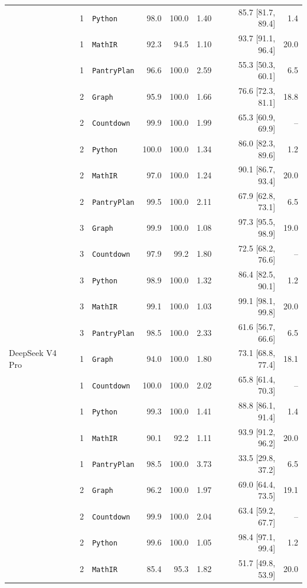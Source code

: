 \begin{longtable}{@{}lrlrrrrr@{}}
     & 1 & \texttt{Python} & 98.0 & 100.0 & 1.40 & 85.7 [81.7, 89.4] & 1.4 \\
     & 1 & \texttt{MathIR} & 92.3 & 94.5 & 1.10 & 93.7 [91.1, 96.4] & 20.0 \\
     & 1 & \texttt{PantryPlan} & 96.6 & 100.0 & 2.59 & 55.3 [50.3, 60.1] & 6.5 \\
     & 2 & \texttt{Graph} & 95.9 & 100.0 & 1.66 & 76.6 [72.3, 81.1] & 18.8 \\
     & 2 & \texttt{Countdown} & 99.9 & 100.0 & 1.99 & 65.3 [60.9, 69.9] & -- \\
     & 2 & \texttt{Python} & 100.0 & 100.0 & 1.34 & 86.0 [82.3, 89.6] & 1.2 \\
     & 2 & \texttt{MathIR} & 97.0 & 100.0 & 1.24 & 90.1 [86.7, 93.4] & 20.0 \\
     & 2 & \texttt{PantryPlan} & 99.5 & 100.0 & 2.11 & 67.9 [62.8, 73.1] & 6.5 \\
     & 3 & \texttt{Graph} & 99.9 & 100.0 & 1.08 & 97.3 [95.5, 98.9] & 19.0 \\
     & 3 & \texttt{Countdown} & 97.9 & 99.2 & 1.80 & 72.5 [68.2, 76.6] & -- \\
     & 3 & \texttt{Python} & 98.9 & 100.0 & 1.32 & 86.4 [82.5, 90.1] & 1.2 \\
     & 3 & \texttt{MathIR} & 99.1 & 100.0 & 1.03 & 99.1 [98.1, 99.8] & 20.0 \\
     & 3 & \texttt{PantryPlan} & 98.5 & 100.0 & 2.33 & 61.6 [56.7, 66.6] & 6.5 \\
    \addlinespace[2pt]
    DeepSeek V4 Pro & 1 & \texttt{Graph} & 94.0 & 100.0 & 1.80 & 73.1 [68.8, 77.4] & 18.1 \\
     & 1 & \texttt{Countdown} & 100.0 & 100.0 & 2.02 & 65.8 [61.4, 70.3] & -- \\
     & 1 & \texttt{Python} & 99.3 & 100.0 & 1.41 & 88.8 [86.1, 91.4] & 1.4 \\
     & 1 & \texttt{MathIR} & 90.1 & 92.2 & 1.11 & 93.9 [91.2, 96.2] & 20.0 \\
     & 1 & \texttt{PantryPlan} & 98.5 & 100.0 & 3.73 & 33.5 [29.8, 37.2] & 6.5 \\
     & 2 & \texttt{Graph} & 96.2 & 100.0 & 1.97 & 69.0 [64.4, 73.5] & 19.1 \\
     & 2 & \texttt{Countdown} & 99.9 & 100.0 & 2.04 & 63.4 [59.2, 67.7] & -- \\
     & 2 & \texttt{Python} & 99.6 & 100.0 & 1.05 & 98.4 [97.1, 99.4] & 1.2 \\
     & 2 & \texttt{MathIR} & 85.4 & 95.3 & 1.82 & 51.7 [49.8, 53.9] & 20.0 \\

\end{longtable}
